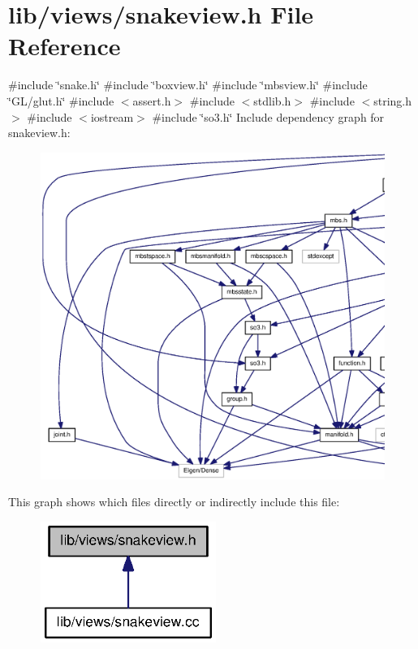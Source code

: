\section{lib/views/snakeview.h \-File \-Reference}
\label{snakeview_8h}
{\ttfamily \#include \char`\"{}snake.\-h\char`\"{}}\*
{\ttfamily \#include \char`\"{}boxview.\-h\char`\"{}}\*
{\ttfamily \#include \char`\"{}mbsview.\-h\char`\"{}}\*
{\ttfamily \#include \char`\"{}\-G\-L/glut.\-h\char`\"{}}\*
{\ttfamily \#include $<$assert.\-h$>$}\*
{\ttfamily \#include $<$stdlib.\-h$>$}\*
{\ttfamily \#include $<$string.\-h$>$}\*
{\ttfamily \#include $<$iostream$>$}\*
{\ttfamily \#include \char`\"{}so3.\-h\char`\"{}}\*
\-Include dependency graph for snakeview.\-h\-:\nopagebreak
\begin{figure}[H]
\begin{center}
\leavevmode
\includegraphics[width=350pt]{snakeview_8h__incl}
\end{center}
\end{figure}
\-This graph shows which files directly or indirectly include this file\-:\nopagebreak
\begin{figure}[H]
\begin{center}
\leavevmode
\includegraphics[width=162pt]{snakeview_8h__dep__incl}
\end{center}
\end{figure}
